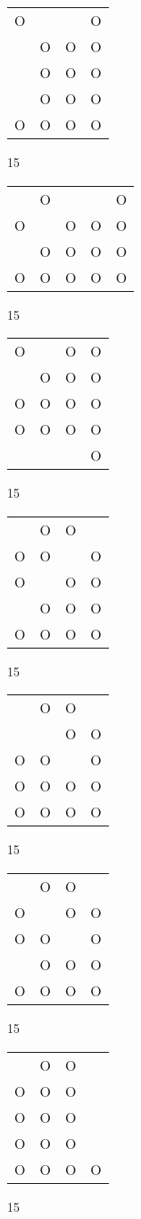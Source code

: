 \begin{tabular}{|m{0.2cm}m{0.2cm}m{0.2cm}m{0.2cm}|}\hline
O& & &O\\
 &O&O&O\\
 &O&O&O\\
 &O&O&O\\
O&O&O&O\\
\hline\end{tabular}15
\begin{tabular}{|m{0.2cm}m{0.2cm}m{0.2cm}m{0.2cm}m{0.2cm}|}\hline
 &O& & &O\\
O& &O&O&O\\
 &O&O&O&O\\
O&O&O&O&O\\
\hline\end{tabular}15
\begin{tabular}{|m{0.2cm}m{0.2cm}m{0.2cm}m{0.2cm}|}\hline
O& &O&O\\
 &O&O&O\\
O&O&O&O\\
O&O&O&O\\
 & & &O\\
\hline\end{tabular}15
\begin{tabular}{|m{0.2cm}m{0.2cm}m{0.2cm}m{0.2cm}|}\hline
 &O&O& \\
O&O& &O\\
O& &O&O\\
 &O&O&O\\
O&O&O&O\\
\hline\end{tabular}15
\begin{tabular}{|m{0.2cm}m{0.2cm}m{0.2cm}m{0.2cm}|}\hline
 &O&O& \\
 & &O&O\\
O&O& &O\\
O&O&O&O\\
O&O&O&O\\
\hline\end{tabular}15
\begin{tabular}{|m{0.2cm}m{0.2cm}m{0.2cm}m{0.2cm}|}\hline
 &O&O& \\
O& &O&O\\
O&O& &O\\
 &O&O&O\\
O&O&O&O\\
\hline\end{tabular}15
\begin{tabular}{|m{0.2cm}m{0.2cm}m{0.2cm}m{0.2cm}|}\hline
 &O&O& \\
O&O&O& \\
O&O&O& \\
O&O&O& \\
O&O&O&O\\
\hline\end{tabular}15
